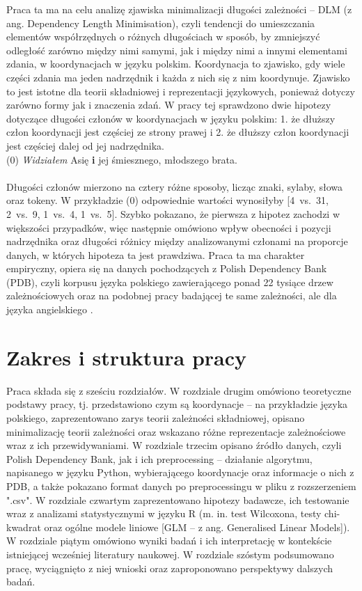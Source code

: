 \documentclass[licencjacka]{pracamgr_Kogni}
\begin{document}
Praca ta ma na celu analizę zjawiska minimalizacji długości zależności – DLM (z ang. Dependency Length Minimisation), czyli tendencji do umieszczania elementów współrzędnych o różnych długościach w sposób, by zmniejszyć odległość zarówno między nimi samymi, jak i między nimi a innymi elementami zdania, w koordynacjach w języku polskim. Koordynacja to zjawisko, gdy wiele części zdania ma jeden nadrzędnik i każda z nich się z nim koordynuje. Zjawisko to jest istotne dla teorii składniowej i reprezentacji językowych, ponieważ dotyczy zarówno formy jak i znaczenia zdań. W pracy tej sprawdzono dwie hipotezy dotyczące długości członów w koordynacjach w języku polskim: 1. że dłuższy człon koordynacji jest częściej ze strony prawej i 2. że dłuższy człon koordynacji jest częściej dalej od jej nadrzędnika.
\\

(0) \textit{Widziałem} Asię \textbf{i} jej śmiesznego, młodszego brata. \\
\\
Długości członów mierzono na cztery różne sposoby, licząc znaki, sylaby, słowa oraz tokeny. W przykładzie (0) odpowiednie wartości wynosiłyby [4~vs.~31, 2~vs.~9, 1~vs.~4, 1~vs.~5]. Szybko pokazano, że pierwsza z hipotez zachodzi w większości przypadków, więc następnie omówiono wpływ obecności i pozycji nadrzędnika oraz długości różnicy między analizowanymi członami na proporcje danych, w których hipoteza ta jest prawdziwa. Praca ta ma charakter empiryczny, opiera się na danych pochodzących z Polish Dependency Bank (PDB), czyli korpusu języka polskiego zawierającego ponad 22 tysiące drzew zależnościowych oraz na podobnej pracy badającej te same zależności, ale dla języka angielskiego \citep{AnonimoweNieopublikowane}.

\section{Zakres i struktura pracy}
Praca składa się z sześciu rozdziałów. W rozdziale drugim omówiono teoretyczne podstawy pracy, tj. przedstawiono czym są koordynacje -- na przykładzie języka polskiego, zaprezentowano zarys teorii zależności składniowej, opisano minimalizację teorii zależności oraz wskazano różne reprezentacje zależnościowe wraz z ich przewidywaniami. W rozdziale trzecim opisano źródło danych, czyli Polish Dependency Bank, jak i ich preprocessing -- działanie algorytmu, napisanego w języku Python, wybierającego koordynacje oraz informacje o nich z PDB, a także pokazano format danych po preprocessingu w pliku z rozszerzeniem ".csv". W rozdziale czwartym zaprezentowano hipotezy badawcze, ich testowanie wraz z analizami statystycznymi w języku R (m. in. test Wilcoxona, testy chi-kwadrat oraz ogólne modele liniowe [GLM – z ang. Generalised Linear Models]). W rozdziale piątym omówiono wyniki badań i ich interpretację w kontekście istniejącej wcześniej literatury naukowej. W rozdziale szóstym podsumowano pracę, wyciągnięto z niej wnioski oraz zaproponowano perspektywy dalszych badań. 
\end{document}
